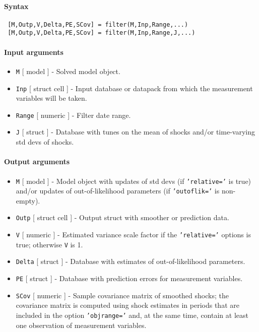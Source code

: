 


	\paragraph{Syntax}
 
 \begin{verbatim}
 [M,Outp,V,Delta,PE,SCov] = filter(M,Inp,Range,...)
 [M,Outp,V,Delta,PE,SCov] = filter(M,Inp,Range,J,...)
 \end{verbatim}
 
 \paragraph{Input arguments}
 
 \begin{itemize}
 \item
   \texttt{M} {[} model {]} - Solved model object.
 \item
   \texttt{Inp} {[} struct \textbar{} cell {]} - Input database or
   datapack from which the measurement variables will be taken.
 \item
   \texttt{Range} {[} numeric {]} - Filter date range.
 \item
   \texttt{J} {[} struct {]} - Database with tunes on the mean of shocks
   and/or time-varying std devs of shocks.
 \end{itemize}
 
 \paragraph{Output arguments}
 
 \begin{itemize}
 \item
   \texttt{M} {[} model {]} - Model object with updates of std devs (if
   \texttt{'relative='} is true) and/or updates of out-of-likelihood
   parameters (if \texttt{'outoflik='} is non-empty).
 \item
   \texttt{Outp} {[} struct \textbar{} cell {]} - Output struct with
   smoother or prediction data.
 \item
   \texttt{V} {[} numeric {]} - Estimated variance scale factor if the
   \texttt{'relative='} options is true; otherwise \texttt{V} is 1.
 \item
   \texttt{Delta} {[} struct {]} - Database with estimates of
   out-of-likelihood parameters.
 \item
   \texttt{PE} {[} struct {]} - Database with prediction errors for
   measurement variables.
 \item
   \texttt{SCov} {[} numeric {]} - Sample covariance matrix of smoothed
   shocks; the covariance matrix is computed using shock estimates in
   periods that are included in the option \texttt{'objrange='} and, at
   the same time, contain at least one observation of measurement
   variables.
 \end{itemize}
 
